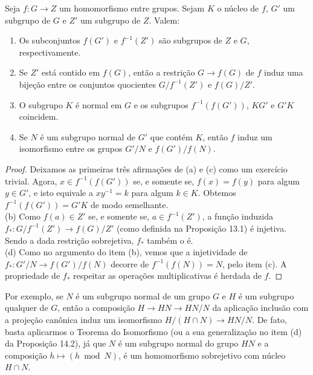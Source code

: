 \begin{proposicao}
Seja $f : G \to Z$ um homomorfismo entre grupos. Sejam $K$ o núcleo de $f$,
$G'$ um subgrupo de $G$ e $Z'$ um subgrupo de $Z$. Valem:
\end{proposicao}

\begin{enumerate}[label=(\alph*), left=0.5cm, align=left, nosep]
    \item Os subconjuntos $f(G')$ e $f^{-1}(Z')$ são subgrupos de $Z$ e $G$,
    respectivamente.

    \item Se $Z'$ está contido em $f(G)$, então a restrição
    $G \to f(G)$ de $f$ induz uma bijeção entre os conjuntos quocientes
    $G/f^{-1}(Z')$ e $f(G)/Z'$.

    \item O subgrupo $K$ é normal em $G$ e os subgrupos
    $f^{-1}(f(G'))$, $KG'$ e $G'K$ coincidem.

    \item Se $N$ é um subgrupo normal de $G'$ que contém $K$, então $f$ induz
    um isomorfismo entre os grupos $G'/N$ e $f(G')/f(N)$.
\end{enumerate}

\begin{proof}
Deixamos as primeiras três afirmações de (a) e (c) como um exercício trivial. Agora, $x \in f^{-1}(f(G'))$ 
se, e somente se, $f(x) = f(y)$ para algum $y \in G'$, e isto equivale a $xy^{-1} = k$ para algum $k \in K$.
Obtemos $f^{-1}(f(G')) = G'K$ de modo semelhante. \\
(b) Como $f(a) \in Z'$ se, e somente se, $a \in f^{-1}(Z')$, a função induzida
$f_* : G/f^{-1}(Z') \to f(G)/Z'$ (como definida na Proposição 13.1) é injetiva. Sendo a dada restrição sobrejetiva,
$f_*$ também o é. \\
(d) Como no argumento do item (b), vemos que a injetividade de $f_* : G'/N \to f(G')/f(N)$ decorre de $f^{-1}(f(N)) = N$, 
pelo item (c). A propriedade de $f_*$ respeitar as operações multiplicativas é herdada de $f$.    
\end{proof}

Por exemplo, se $N$ é um subgrupo normal de um grupo $G$ e $H$ é um subgrupo qualquer de $G$, então a composição 
$H \to HN \to HN/N$ da aplicação inclusão com a projeção canônica induz um isomorfismo $H/(H \cap N) \to HN/N$. 
De fato, basta aplicarmos o Teorema do Isomorfismo (ou a sua generalização no item (d) da Proposição 14.2), já que 
$N$ é um subgrupo normal do grupo $HN$ e a composição $h \mapsto (h \bmod N)$, é um homomorfismo sobrejetivo com núcleo $H \cap N$.

